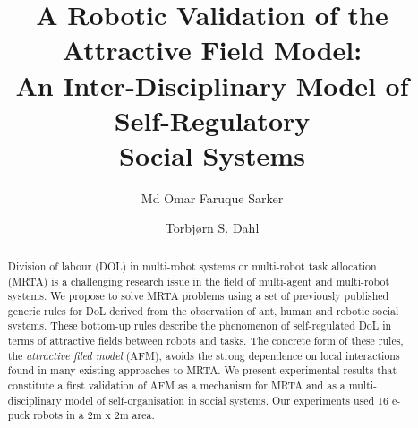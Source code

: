 \documentclass{llncs}
\begin{document}
\title{A Robotic Validation of the Attractive Field Model:\\ An Inter-Disciplinary Model of Self-Regulatory\\ Social Systems}
\author{Md Omar Faruque Sarker \and
Torbj{\o}rn S. Dahl %
}
\maketitle
\begin{abstract}
Division of labour (DOL) in multi-robot systems or multi-robot task allocation (MRTA) is a challenging research issue in the field of multi-agent and multi-robot systems.
We propose to solve MRTA problems using a set of previously published generic rules for DoL derived from the observation of ant, human and robotic social systems.
These bottom-up rules describe the phenomenon of self-regulated DoL in terms of attractive fields between robots and tasks.
The concrete form of these rules, the \textit{attractive filed model} (AFM), avoids the strong dependence on local interactions found in many existing approaches to MRTA.
We present experimental results that constitute a first validation of AFM as a mechanism for MRTA and as a multi-disciplinary model of self-organisation in social systems.
Our experiments used 16 e-puck robots in a 2m x 2m area.
\end{abstract}
\end{document}
